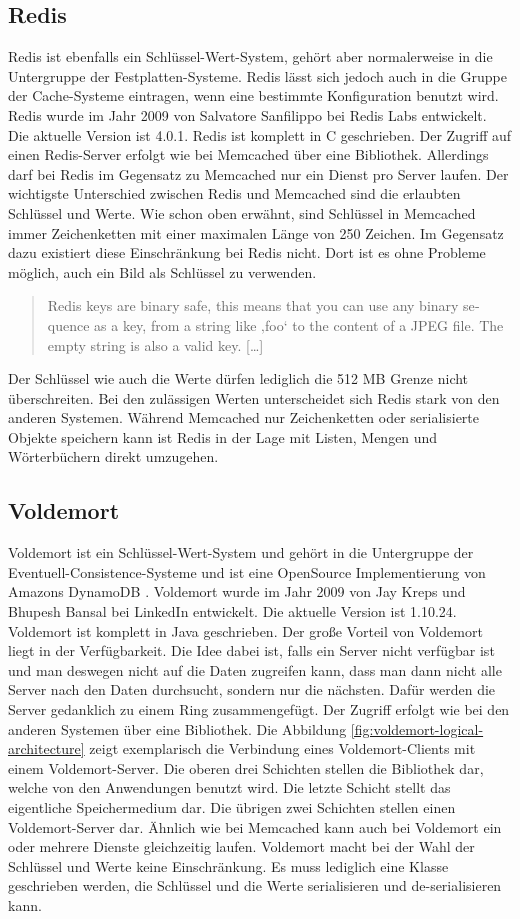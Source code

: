 \subsection{Redis}
Redis ist ebenfalls ein Schlüssel-Wert-System, gehört aber normalerweise in die
Untergruppe der Festplatten-Systeme. Redis lässt sich jedoch auch in die Gruppe
der Cache-Systeme eintragen, wenn eine bestimmte Konfiguration benutzt wird.
Redis wurde im Jahr 2009 von Salvatore Sanfilippo bei Redis Labs entwickelt.
Die aktuelle Version ist 4.0.1. Redis ist komplett in C geschrieben.
Der Zugriff auf einen Redis-Server erfolgt wie bei Memcached über eine
Bibliothek. Allerdings darf bei Redis im Gegensatz zu Memcached nur ein Dienst
pro Server laufen. Der wichtigste Unterschied zwischen Redis und Memcached sind
die erlaubten Schlüssel und Werte. Wie schon oben erwähnt, sind Schlüssel in
Memcached immer Zeichenketten mit einer maximalen Länge von 250 Zeichen. Im
Gegensatz dazu existiert diese Einschränkung bei Redis nicht. Dort ist es ohne
Probleme möglich, auch ein Bild als Schlüssel zu verwenden.

\foreignblockquote{english}[\cite{Redis2017}]{Redis keys are binary safe, this
means that you can use any binary sequence as a key, from a string like ‚foo‘
to the content of a JPEG file. The empty string is also a valid key. [\dots]}

Der Schlüssel wie auch die Werte dürfen lediglich die 512 MB Grenze nicht
überschreiten. Bei den zulässigen Werten unterscheidet sich Redis stark von den
anderen Systemen. Während Memcached nur Zeichenketten oder serialisierte Objekte
speichern kann ist Redis in der Lage mit Listen, Mengen und Wörterbüchern direkt
umzugehen.

\subsection{Voldemort}
Voldemort ist ein Schlüssel-Wert-System und gehört in die Untergruppe der
Eventuell-Consistence-Systeme und ist eine OpenSource Implementierung von
Amazons DynamoDB \cite{DeCandia2007}. Voldemort wurde im Jahr 2009 von Jay Kreps
und Bhupesh Bansal bei LinkedIn entwickelt. Die aktuelle Version ist 1.10.24.
Voldemort ist komplett in Java geschrieben. Der große Vorteil von Voldemort
liegt in der Verfügbarkeit. Die Idee dabei ist, falls ein Server nicht verfügbar
ist und man deswegen nicht auf die Daten zugreifen kann, dass man dann nicht
alle Server nach den Daten durchsucht, sondern nur die nächsten. Dafür werden die
Server gedanklich zu einem Ring zusammengefügt. Der Zugriff erfolgt wie bei den
anderen Systemen über eine Bibliothek. Die Abbildung \ref{fig:voldemort-logical-architecture}
zeigt exemplarisch die Verbindung eines Voldemort-Clients mit einem
Voldemort-Server. Die oberen drei Schichten stellen die Bibliothek dar, welche
von den Anwendungen benutzt wird. Die letzte Schicht stellt das eigentliche
Speichermedium dar. Die übrigen zwei Schichten stellen einen Voldemort-Server
dar. Ähnlich wie bei Memcached kann auch bei Voldemort ein oder mehrere Dienste
gleichzeitig laufen. Voldemort macht bei der Wahl der Schlüssel
und Werte keine Einschränkung. Es muss lediglich eine Klasse geschrieben werden,
die Schlüssel und die Werte serialisieren und de-serialisieren kann.

